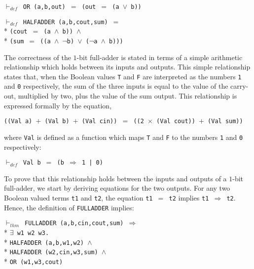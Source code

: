 \begin{normalsize}
$\vdash_{def}$\verb" OR (a,b,out) "$=$\verb" (out "$=$\verb" (a "$\vee$\verb" b))"

\begin{minipage}{17cm}
$\vdash_{def}$\verb" HALFADDER (a,b,cout,sum) "$=$\\*
\verb"(cout "$=$\verb" (a "$\wedge$\verb" b)) "$\wedge$\\*
\verb"(sum "$=$\verb" ((a "$\wedge$\verb" "$\neg$\verb"b) "$\vee$\verb" ("$\neg$\verb"a "$\wedge$\verb" b)))"
\end{minipage}

The correctness of the \mbox{$1$-bit} \mbox{full-adder} is stated in terms of
a simple arithmetic relationship which holds between
its inputs and outputs.
This simple relationship states that,
when the Boolean values \verb"T" and \verb"F" are interpreted as
the numbers \verb"1" and \verb"0" respectively,
the sum of the three inputs is equal to the value of the carry-out,
multiplied by two, plus the value of the sum output.
This relationship is expressed formally by the equation,

\hspace*{\fill}
\verb"((Val a) "$+$\verb" (Val b) "$+$\verb" (Val cin)) "$=$\verb" ((2 "$\times$\verb" (Val cout)) "$+$\verb" (Val sum))"
\hspace*{\fill}

where \verb"Val" is defined as a function which maps \verb"T" and \verb"F" to
the numbers \verb"1" and \verb"0" respectively:

$\vdash_{def}$\verb" Val b "$=$\verb" (b "$\Rightarrow$\verb" 1 | 0)"

To prove that this relationship holds between the inputs and outputs
of a \mbox{$1$-bit} \mbox{full-adder},
we start by deriving equations for the two outputs.
For any two Boolean valued terms \verb"t1" and \verb"t2",
the equation
\verb"t1 "$=$\verb" t2" implies \verb"t1 "$\Longrightarrow$\verb" t2".
Hence, the definition of \verb"FULLADDER" implies:

\begin{minipage}{17cm}
$\vdash_{thm}$\verb" FULLADDER (a,b,cin,cout,sum) "$\Longrightarrow$\\*
$\exists$\verb" w1 w2 w3."\\*
\verb"HALFADDER (a,b,w1,w2) "$\wedge$\\*
\verb"HALFADDER (w2,cin,w3,sum) "$\wedge$\\*
\verb"OR (w1,w3,cout)"
\end{minipage}


\end{normalsize}
